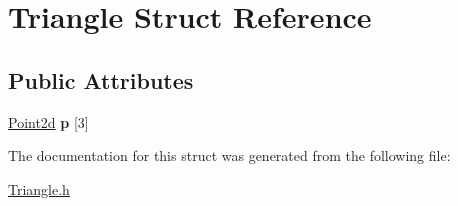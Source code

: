\hypertarget{struct_triangle}{\section{Triangle Struct Reference}
\label{struct_triangle}
}
\subsection*{Public Attributes}
\begin{DoxyCompactItemize}
\item 
\hypertarget{struct_triangle_a99242d641be48aa814ee08fb2cc8a05d}{\hyperlink{struct_point2d}{Point2d} {\bfseries p} \mbox{[}3\mbox{]}}\label{struct_triangle_a99242d641be48aa814ee08fb2cc8a05d}

\end{DoxyCompactItemize}


The documentation for this struct was generated from the following file\-:\begin{DoxyCompactItemize}
\item 
\hyperlink{_triangle_8h}{Triangle.\-h}\end{DoxyCompactItemize}
